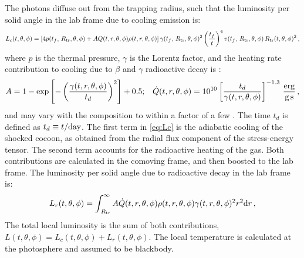 \documentclass[twocolumn,dvipsnames]{aastex62}
\newcommand{\rtr}{\,{R_{\rm tr}}}
\begin{document}
The photons diffuse out from the trapping radius, such that the luminosity per solid angle in the lab frame due to cooling emission is:
\begin{equation}\label{eq:Lc}
    L_c(t,\theta,\phi) = \left[4p(t_f,\rtr,\theta,\phi)+AQ(t,r,\theta,\phi)\rho(t,r,\theta,\phi)\right]\gamma(t_f,\rtr,\theta,\phi)^2\left(\frac{t_f}{t}\right)^4v(t_f,\rtr,\theta,\phi)\rtr(t,\theta,\phi)^2\,,
\end{equation}
where $ p $ is the thermal pressure, $ \gamma $ is the Lorentz factor, and the heating rate contribution to cooling due to $ \beta $ and $ \gamma $ radioactive decay is \citep{Hotokezaka2016b}:
\begin{equation}\label{eq:Q}
    A = 1-{\rm exp}\left[-\left(\frac{\gamma(t,r,\theta,\phi)}{t_d}\right)^2\right]+0.5;\,\,\,\,\,
    \dot{Q}(t,r,\theta,\phi) = 10^{10}\left[\frac{t_d}{\gamma(t,r,\theta,\phi)}\right]^{-1.3}\,{\rm\frac{erg}{g\,s}}\,,
\end{equation}
and may vary with the composition to within a factor of a few \citep[see e.g.,][]{Freiburghaus1999,Metzger2010a,Korobkin2012,Wanajo2014,Hotokezaka2016b}. The time $ t_d $ is defined as $ t_d \equiv t/{\rm day} $.
The first term in \eqref{eq:Lc} is the adiabatic cooling of the shocked cocoon, as obtained from the radial flux component of the stress-energy tensor. The second term accounts for the radioactive heating of the gas. Both contributions are calculated in the comoving frame, and then boosted to the lab frame.
The luminosity per solid angle due to radioactive decay in the lab frame is:
\begin{equation}\label{eq:Lr}
   L_r(t,\theta,\phi) = \int_{\rtr}^{\infty}A\dot{Q}(t,r,\theta,\phi){\rho(t,r,\theta,\phi)\gamma(t,r,\theta,\phi)^2r^2\mathrm{d}r}\,,
\end{equation}
The total local luminosity is the sum of both contributions, $ L(t,\theta,\phi) = L_c(t,\theta,\phi) +L_r(t,\theta,\phi) $.
The local temperature is calculated at the photosphere and assumed to be blackbody.
\end{document}
